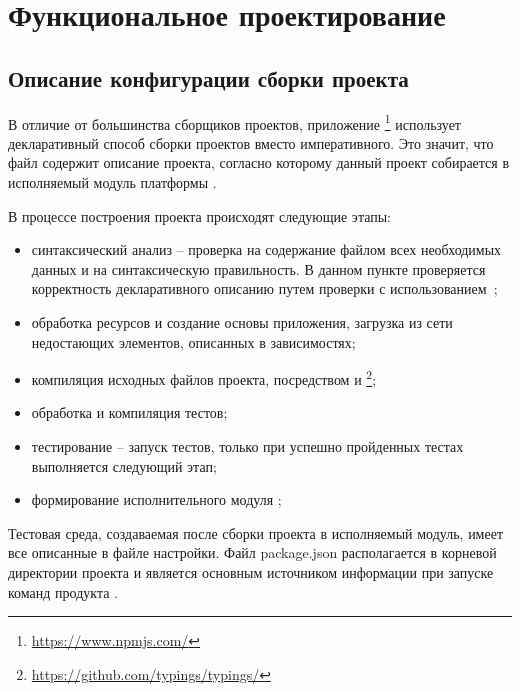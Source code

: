 \section{Функциональное проектирование} %
\label{sec:arch_and_mod}

\subsection{Описание конфигурации сборки проекта}
\label{sub:arch_and_mod:graphlib}

В отличие от большинства сборщиков проектов, приложение \npm{}\footnote{\url{https://www.npmjs.com/}} использует декларативный способ сборки проектов вместо императивного. Это значит, что \json{} файл содержит описание проекта, согласно которому данный проект собирается в исполняемый модуль платформы \nodejs{}.

В процессе построения проекта происходят следующие этапы:
\begin{itemize}
  \item синтаксический анализ – проверка на содержание файлом всех необходимых данных и на синтаксическую правильность. В данном пункте проверяется корректность декларативного описанию путем проверки с использованием \npmrc{};
  \item обработка ресурсов и создание основы приложения, загрузка из сети недостающих элементов, описанных в зависимостях;
  \item компиляция исходных файлов проекта, посредством \tsc{} и \typings{}\footnote{\url{https://github.com/typings/typings/}};
  \item обработка и компиляция тестов;
  \item тестирование – запуск тестов, только при успешно пройденных тестах выполняется следующий этап;
  \item формирование исполнительного модуля \nodejs{};
\end{itemize}

Тестовая среда, создаваемая после сборки проекта в исполняемый модуль, имеет все описанные в \json{} файле настройки. Файл package.json располагается в корневой директории проекта и является основным источником информации при запуске команд продукта \npm{}.

